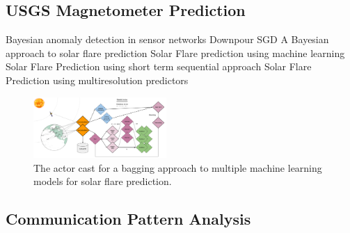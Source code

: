 \documentclass[conference,twocolumn,11pt]{IEEEtran}
\begin{document}
\subsection{USGS Magnetometer Prediction}

Bayesian anomaly detection in sensor networks \cite{hill_real-time_2007}
Downpour SGD \cite{dean_large_2012}
A Bayesian approach to solar flare prediction \cite{wheatland_bayesian_2004}
Solar Flare prediction using machine learning \cite{qahwaji_automatic_2007}
Solar Flare Prediction using short term sequential approach \cite{yu_short-term_2009}
Solar Flare Prediction using multiresolution predictors \cite{yu_short-term_2010}

\begin{figure}[!h]
    \centering
    \includegraphics[width=0.45\textwidth]{solar_cast}
    \caption{The actor cast for a bagging approach to multiple machine learning models for solar flare prediction.}
    \label{fig:solar_cast}
\end{figure}

\subsection{Communication Pattern Analysis}
\end{document}
